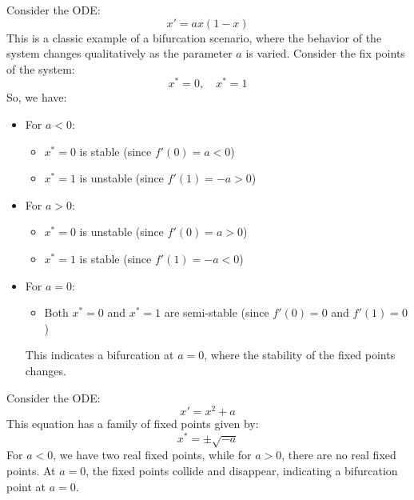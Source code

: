 \documentclass[11pt]{article}
\begin{document}
\begin{example}
    Consider the ODE:
    $$
    x' = ax(1 - x)
    $$
    This is a classic example of a bifurcation scenario, where the behavior of the system changes qualitatively as the parameter \(a\) is varied. Consider the fix points of the system:
    $$
    x^* = 0, \quad x^* = 1
    $$
    So, we have:
    \begin{itemize}
        \item For \( a < 0 \):
        \begin{itemize}
            \item \( x^* = 0 \) is stable (since \( f'(0) = a < 0 \))
            \item \( x^* = 1 \) is unstable (since \( f'(1) = -a > 0 \))
        \end{itemize}
        \item For \( a > 0 \):
        \begin{itemize}
            \item \( x^* = 0 \) is unstable (since \( f'(0) = a > 0 \))
            \item \( x^* = 1 \) is stable (since \( f'(1) = -a < 0 \))
        \end{itemize}
        \item For \( a = 0 \):
        \begin{itemize}
            \item Both \( x^* = 0 \) and \( x^* = 1 \) are semi-stable (since \( f'(0) = 0 \) and \( f'(1) = 0 \))
        \end{itemize}
        This indicates a bifurcation at \( a = 0 \), where the stability of the fixed points changes.
    \end{itemize}
\end{example}


\begin{example} \label{ex:bifurcation-saddle-node}
    Consider the ODE:
    $$
    x' = x^2 + a
    $$
    This equation has a family of fixed points given by:
    $$
    x^* = \pm\sqrt{-a}
    $$
    For \( a < 0 \), we have two real fixed points, while for \( a > 0 \), there are no real fixed points. At \( a = 0 \), the fixed points collide and disappear, indicating a bifurcation point at \( a = 0 \).
\end{example}
\end{document}
